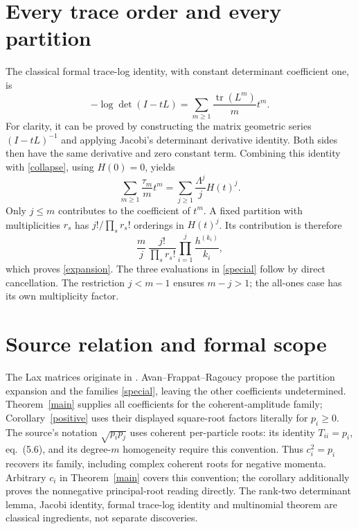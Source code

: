 \documentclass[11pt]{article}
\begin{document}
\section*{Every trace order and every partition}
The classical formal trace-log identity, with constant determinant coefficient one, is
\[
 -\log\det(I-tL)=\sum_{m\geq1}\frac{\operatorname{tr}(L^m)}m t^m.
\]
For clarity, it can be proved by constructing the matrix geometric series $(I-tL)^{-1}$ and applying Jacobi's determinant derivative identity. Both sides then have the same derivative and zero constant term. Combining this identity with \eqref{collapse}, using $H(0)=0$, yields
\begin{equation}\label{log}
 \sum_{m\geq1}\frac{\tau_m}m t^m
   =\sum_{j\geq1}\frac{\Lambda^j}{j}H(t)^j.
\end{equation}
Only $j\leq m$ contributes to the coefficient of $t^m$. A fixed partition with multiplicities $r_s$ has $j!/\prod_s r_s!$ orderings in $H(t)^j$. Its contribution is therefore
\[
 \frac mj\,\frac{j!}{\prod_s r_s!}\prod_{i=1}^j\frac{h^{(k_i)}}{k_i},
\]
which proves \eqref{expansion}. The three evaluations in \eqref{special} follow by direct cancellation. The restriction $j<m-1$ ensures $m-j>1$; the all-ones case has its own multiplicity factor.

\section*{Source relation and formal scope}
The Lax matrices originate in \cite{RB,AFR2023}. Avan--Frappat--Ragoucy \cite[Conjecture~5.2, eqs.~(5.20)--(5.21)]{AFR} propose the partition expansion and the families \eqref{special}, leaving the other coefficients undetermined. Theorem~\ref{main} supplies all coefficients for the coherent-amplitude family; Corollary~\ref{positive} uses their displayed square-root factors literally for $p_i\geq0$. The source's notation $\sqrt{p_ip_j}$ uses coherent per-particle roots: its identity $T_{ii}=p_i$, eq.~(5.6), and its degree-$m$ homogeneity require this convention. Thus $c_i^2=p_i$ recovers its family, including complex coherent roots for negative momenta. Arbitrary $c_i$ in Theorem~\ref{main} covers this convention; the corollary additionally proves the nonnegative principal-root reading directly. The rank-two determinant lemma, Jacobi identity, formal trace-log identity and multinomial theorem are classical ingredients, not separate discoveries.
\end{document}
